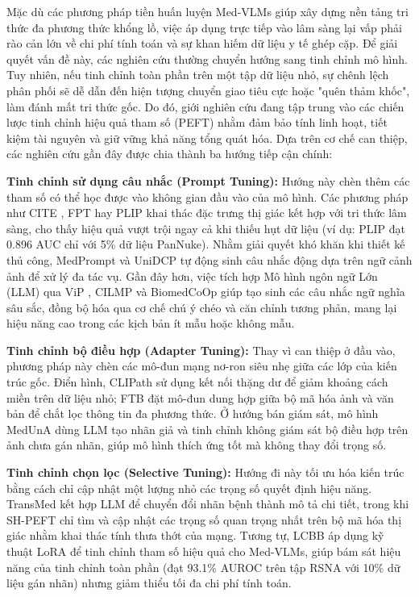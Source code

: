   Mặc dù các phương pháp tiền huấn luyện Med-VLMs giúp xây dựng nền tảng tri thức đa phương thức khổng lồ, việc áp dụng trực tiếp vào lâm sàng lại vấp phải rào cản lớn về chi phí tính toán và sự khan hiếm dữ liệu y tế ghép cặp. Để giải quyết vấn đề này, các nghiên cứu thường chuyển hướng sang tinh chỉnh mô hình. Tuy nhiên, nếu tinh chỉnh toàn phần trên một tập dữ liệu nhỏ, sự chênh lệch phân phối sẽ dễ dẫn đến hiện tượng chuyển giao tiêu cực hoặc "quên thảm khốc", làm đánh mất tri thức gốc. Do đó, giới nghiên cứu đang tập trung vào các chiến lược tinh chỉnh hiệu quả tham số (PEFT) nhằm đảm bảo tính linh hoạt, tiết kiệm tài nguyên và giữ vững khả năng tổng quát hóa. Dựa trên cơ chế can thiệp, các nghiên cứu gần đây được chia thành ba hướng tiếp cận chính:

  \pagebreak
  
  \textbf{Tinh chỉnh sử dụng câu nhắc (Prompt Tuning):} Hướng này chèn thêm các tham số có thể học được vào không gian đầu vào của mô hình. Các phương pháp như CITE \cite{CITE}, FPT \cite{FPT} hay PLIP \cite{PLIP} khai thác đặc trưng thị giác kết hợp với tri thức lâm sàng, cho thấy hiệu quả vượt trội ngay cả khi thiếu hụt dữ liệu (ví dụ: PLIP đạt 0.896 AUC chỉ với 5\% dữ liệu PanNuke). Nhằm giải quyết khó khăn khi thiết kế thủ công, MedPrompt \cite{MedPrompt} và UniDCP \cite{UniDCP} tự động sinh câu nhắc động dựa trên ngữ cảnh ảnh để xử lý đa tác vụ. Gần đây hơn, việc tích hợp Mô hình ngôn ngữ Lớn (LLM) qua ViP \cite{ViP}, CILMP \cite{CLIMP} và BiomedCoOp \cite{BiomedCoOp} giúp tạo sinh các câu nhắc ngữ nghĩa sâu sắc, đồng bộ hóa qua cơ chế chú ý chéo và căn chỉnh tương phản, mang lại hiệu năng cao trong các kịch bản ít mẫu hoặc không mẫu.
  
  \textbf{Tinh chỉnh bộ điều hợp (Adapter Tuning):} Thay vì can thiệp ở đầu vào, phương pháp này chèn các mô-đun mạng nơ-ron siêu nhẹ giữa các lớp của kiến trúc gốc. Điển hình, CLIPath \cite{CLIPath} sử dụng kết nối thặng dư để giảm khoảng cách miền trên dữ liệu nhỏ; FTB \cite{FTB} đặt mô-đun dung hợp giữa bộ mã hóa ảnh và văn bản để chắt lọc thông tin đa phương thức. Ở hướng bán giám sát, mô hình MedUnA \cite{MedUnA} dùng LLM tạo nhãn giả và tinh chỉnh không giám sát bộ điều hợp trên ảnh chưa gán nhãn, giúp mô hình thích ứng tốt mà không thay đổi trọng số.
  
  \textbf{Tinh chỉnh chọn lọc (Selective Tuning):} Hướng đi này tối ưu hóa kiến trúc bằng cách chỉ cập nhật một lượng nhỏ các trọng số quyết định hiệu năng. TransMed \cite{TransMed} kết hợp LLM để chuyển đổi nhãn bệnh thành mô tả chi tiết, trong khi SH-PEFT \cite{SH-PEFT} chỉ tìm và cập nhật các trọng số quan trọng nhất trên bộ mã hóa thị giác nhằm khai thác tính thưa thớt của mạng. Tương tự, LCBB \cite{LCBB} áp dụng kỹ thuật LoRA để tinh chỉnh tham số hiệu quả cho Med-VLMs, giúp bám sát hiệu năng của tinh chỉnh toàn phần (đạt 93.1\% AUROC trên tập RSNA với 10\% dữ liệu gán nhãn) nhưng giảm thiểu tối đa chi phí tính toán.
      
